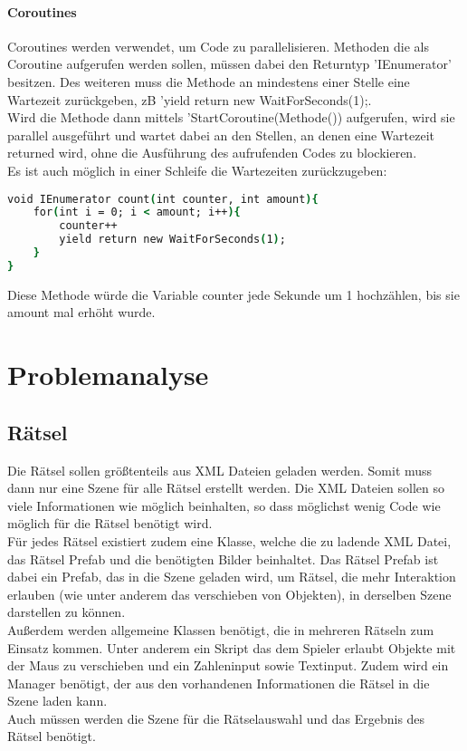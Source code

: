 \subsubsection{Coroutines}
\label{Grundlagen:Coroutines}
Coroutines werden verwendet, um Code zu parallelisieren. Methoden die als Coroutine aufgerufen werden sollen, müssen dabei den Returntyp 'IEnumerator' besitzen. Des weiteren muss die Methode an mindestens einer Stelle eine Wartezeit zurückgeben, zB 'yield return new WaitForSeconds(1);.\\
Wird die Methode dann mittels 'StartCoroutine(Methode()) aufgerufen, wird sie parallel ausgeführt und wartet dabei an den Stellen, an denen eine Wartezeit returned wird, ohne die Ausführung des aufrufenden Codes zu blockieren.\\
Es ist auch möglich in einer Schleife die Wartezeiten zurückzugeben:
\begin{lstlisting}[language=csh, caption={Laden einer Szene im Skript}]
void IEnumerator count(int counter, int amount){
	for(int i = 0; i < amount; i++){
		counter++
		yield return new WaitForSeconds(1);
	}
}
\end{lstlisting}
Diese Methode würde die Variable counter jede Sekunde um 1 hochzählen, bis sie amount mal erhöht wurde.

\chapter{Problemanalyse}
\label{cha:problemanalyse}

\section{Rätsel}
Die Rätsel sollen größtenteils aus XML Dateien geladen werden. Somit muss dann nur eine Szene für alle Rätsel erstellt werden. Die XML Dateien sollen so viele Informationen wie möglich beinhalten, so dass möglichst wenig Code wie möglich für die Rätsel benötigt wird. \\
Für jedes Rätsel existiert zudem eine Klasse, welche die zu ladende XML Datei, das Rätsel Prefab und die benötigten Bilder beinhaltet. Das Rätsel Prefab ist dabei ein Prefab, das in die Szene geladen wird, um Rätsel, die mehr Interaktion erlauben (wie unter anderem das verschieben von Objekten), in derselben Szene darstellen zu können. \\
Außerdem werden allgemeine Klassen benötigt, die in mehreren Rätseln zum Einsatz kommen. Unter anderem ein Skript das dem Spieler erlaubt Objekte mit der Maus zu verschieben und ein Zahleninput sowie Textinput. Zudem wird ein Manager benötigt, der aus den vorhandenen Informationen die Rätsel in die Szene laden kann.\\
Auch müssen werden die Szene für die Rätselauswahl und das Ergebnis des Rätsel benötigt.

